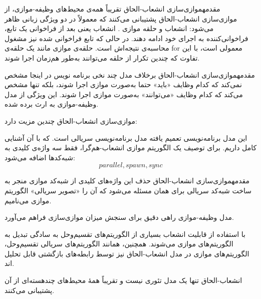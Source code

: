 \begin{itemframe-s}{مقدمه}{موازی‌سازی انشعاب-‌الحاق}
\itm
تقریباً همه‌ی محیط‌های وظیفه-موازی، از موازی‌سازی انشعاب-الحاق پشتیبانی می‌کنند که معمولاً در دو ویژگی زبانی ظاهر می‌شود: انشعاب
و حلقه موازی
 .
\itm
انشعاب یعنی بعد از فراخوانی یک تابع، فراخوانی‌کننده به اجرای خود ادامه دهند. در حالی که  تابع فراخوانی شده نیز مشغول محاسبه‌ی نتیجه‌اش است.
\itm
حلقه‌ی موازی مانند یک حلقه‌ی for معمولی است، با این تفاوت که چندین تکرار از حلقه می‌توانند به‌طور هم‌زمان اجرا شوند.
\end{itemframe-s}


\begin{itemframe-s}{مقدمه}{موازی‌سازی انشعاب-‌الحاق}
\itm
برخلاف مدل چند نخی برنامه نویس در اینجا مشخص نمی‌کند که کدام وظایف «باید» حتما به‌صورت موازی اجرا شوند، بلکه تنها مشخص می‌کند که کدام وظایف «می‌توانند» به‌صورت موازی اجرا شوند. این ویژگی از مدل وظیفه-موازی به ارث برده شده.

\itm
موازی‌سازی انشعاب-الحاق چندین مزیت دارد:
\item[1]
این مدل برنامه‌نویسی تعمیم یافته مدل برنامه‌نویسی سریالی است. که با آن آشنایی کامل داریم.
برای توصیف یک الگوریتم موازی انشعاب-هم‌گرا، فقط سه واژه‌ی کلیدی به شبه‌کدها اضافه می‌شود:
$$parallel, spawn, sync$$
\end{itemframe-s}


\begin{itemframe-s}{مقدمه}{موازی‌سازی انشعاب-‌الحاق}
\itm
حذف این واژه‌های کلیدی از شبه‌کد موازی منجر به ساخت شبه‌کد سریالی برای همان مسئله می‌شود که آن را «تصویر سریالی»
 الگوریتم موازی می‌نامیم.
\item[2]
مدل وظیفه-موازی راهی دقیق برای سنجش میزان موازی‌سازی فراهم می‌آورد.
\item[3]
با استفاده از قابلیت انشعاب بسیاری از الگوریتم‌های تقسیم‌و‌حل به سادگی تبدیل به الگوریتم‌های موازی می‌شوند. همچنین، همانند الگوریتم‌های سریالی تقسیم‌و‌حل، الگوریتم‌های موازی در مدل انشعاب-الحاق نیز توسط رابطه‌های بازگشتی قابل تحلیل اند.
\item[4]
انشعاب-الحاق تنها یک مدل تئوری نیست و تقریباً همه‌ٔ محیط‌های چند‌هسته‌ای از آن پشتیبانی می‌کنند.
\end{itemframe-s}